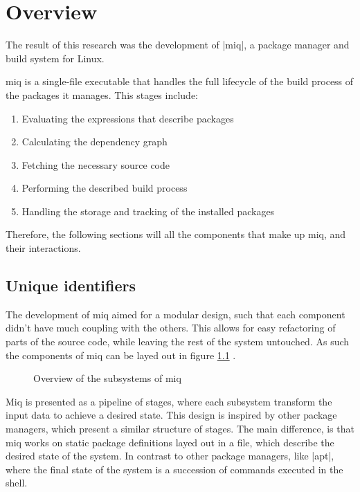 \chapter{Overview}

The result of this research was the development of |miq|, a package manager and
build system for Linux.

miq is a single-file executable that handles the full lifecycle of the build
process of the packages it manages. This stages include:

\begin{enumerate}
    \item Evaluating the expressions that describe packages
    \item Calculating the dependency graph
    \item Fetching the necessary source code
    \item Performing the described build process
    \item Handling the storage and tracking of the installed packages
\end{enumerate}

Therefore, the following sections will all the components that make up miq, and
their interactions.

\section{Unique identifiers}

The development of miq aimed for a modular design, such that
each component didn't have much coupling with the others.
This allows for easy refactoring of parts of the source
code, while leaving the rest of the system untouched. As
such the components of miq can be layed out in figure
\ref{fig:miq-components} .

\begin{figure}[hbtp]
    \centerfloat
    
    \caption{Overview of the subsystems of miq}
    \label{fig:miq-components}
\end{figure}

Miq is presented as a pipeline of stages, where each
subsystem transform the input data to achieve a desired
state. This design is inspired by other package managers,
which present a similar structure of stages. The main
difference, is that miq works on static package definitions
layed out in a file, which describe the desired state of the
system. In contrast to other package managers, like |apt|,
where the final state of the system is a succession of
commands executed in the shell.

